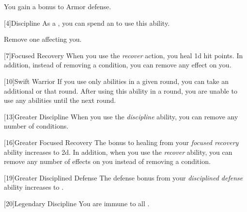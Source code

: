         You gain a  bonus to Armor defense.

        [4]{Discipline} As a , you can spend an  to use this ability.
        \begin{ability}
            \begin{spelleffects}
                \spelleffect Remove one  affecting you.
            \end{spelleffects}
        \end{ability}

        [7]{Focused Recovery}
        When you use the \textit{recover} action, you heal \plus1d hit points.
        In addition, instead of removing a condition, you can remove any  effect on you.

        [10]{Swift Warrior}
        If you use only  abilities in a given round, you can take an additional  or  that round.
        After using this ability in a round, you are unable to use any  abilities until the next round.

        [13]{Greater Discipline}
        When you use the \textit{discipline} ability, you can remove any number of conditions.

        [16]{Greater Focused Recovery}
        The bonus to healing from your \textit{focused recovery} ability increases to \plus2d.
        In addition, when you use the \textit{recover} ability, you can remove any number of  effects on you instead of removing a condition.

        [19]{Greater Disciplined Defense}
        The defense bonus from your \textit{disciplined defense} ability increases to .

        [20]{Legendary Discipline} 
        You are immune to all .

